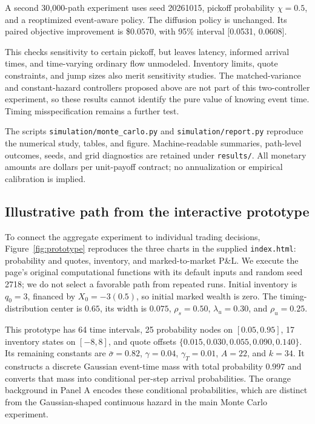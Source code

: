 \documentclass[11pt]{article}
\newcommand{\1}{\mathbf 1}
\begin{document}
A second 30,000-path experiment uses seed 20261015, pickoff probability
$\chi=0.5$, and a reoptimized event-aware policy. The diffusion policy is
unchanged. Its paired objective improvement is
\$0.0570, with 95\% interval [0.0531, 0.0608].

This checks sensitivity to certain pickoff, but leaves latency, informed
arrival times, and time-varying ordinary flow unmodeled. Inventory limits,
quote constraints, and jump sizes also merit sensitivity studies. The
matched-variance and constant-hazard controllers proposed above are not part
of this two-controller experiment, so these results cannot identify the pure
value of knowing event time. Timing misspecification remains a further test.

The scripts \texttt{simulation/monte\_carlo.py} and
\texttt{simulation/report.py} reproduce the numerical study, tables, and figure.
Machine-readable summaries, path-level outcomes, seeds, and grid diagnostics
are retained under \texttt{results/}. All monetary amounts are dollars per
unit-payoff contract; no annualization or empirical calibration is implied.

\clearpage
\subsection{Illustrative path from the interactive prototype}
\label{sec:prototype}
To connect the aggregate experiment to individual trading decisions,
Figure~\ref{fig:prototype} reproduces the three charts in the supplied
\texttt{index.html}: probability and quotes, inventory, and marked-to-market
P\&L. We execute the page's original computational functions with its default
inputs and random seed 2718; we do not select a favorable path from repeated
runs. Initial inventory is $q_0=3$, financed by $X_0=-3(0.5)$, so initial marked
wealth is zero. The timing-distribution center is $0.65$, its width is $0.075$,
$\rho_s=0.50$, $\lambda_u=0.30$, and $\rho_u=0.25$.

This prototype has 64 time intervals, 25 probability nodes on $[0.05,0.95]$,
17 inventory states on $[-8,8]$, and quote offsets
$\{0.015,0.030,0.055,0.090,0.140\}$. Its remaining constants are
$\bar\sigma=0.82$, $\gamma=0.04$, $\gamma_T=0.01$, $A=22$, and $k=34$.
It constructs a discrete Gaussian event-time mass with total probability
$0.997$ and converts that mass into conditional per-step arrival probabilities.
The orange background in Panel A encodes these conditional probabilities,
which are distinct from the Gaussian-shaped continuous hazard in the main
Monte Carlo experiment.
\end{document}
